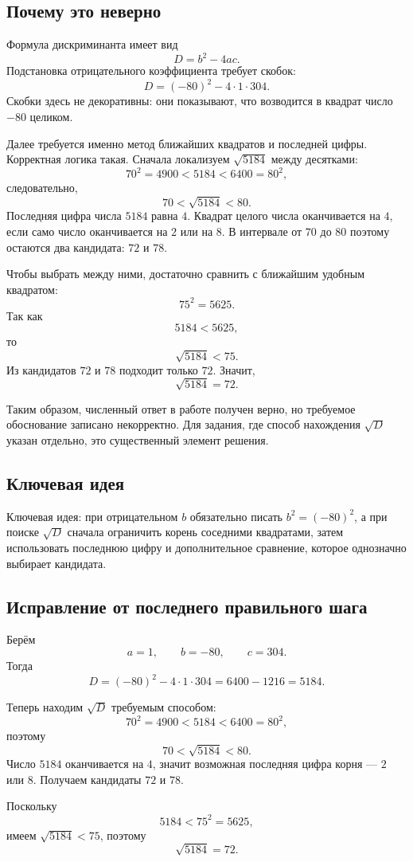 \documentclass[12pt,a4paper]{article}
\begin{document}
\subsection*{Почему это неверно}
Формула дискриминанта имеет вид
\[
D=b^2-4ac.
\]
Подстановка отрицательного коэффициента требует скобок:
\[
D=(-80)^2-4\cdot1\cdot304.
\]
Скобки здесь не декоративны: они показывают, что возводится в квадрат число $-80$ целиком.

Далее требуется именно метод ближайших квадратов и последней цифры. Корректная логика такая. Сначала локализуем $\sqrt{5184}$ между десятками:
\[
70^2=4900<5184<6400=80^2,
\]
следовательно,
\[
70<\sqrt{5184}<80.
\]
Последняя цифра числа $5184$ равна $4$. Квадрат целого числа оканчивается на $4$, если само число оканчивается на $2$ или на $8$. В интервале от $70$ до $80$ поэтому остаются два кандидата: $72$ и $78$.

Чтобы выбрать между ними, достаточно сравнить с ближайшим удобным квадратом:
\[
75^2=5625.
\]
Так как
\[
5184<5625,
\]
то
\[
\sqrt{5184}<75.
\]
Из кандидатов $72$ и $78$ подходит только $72$. Значит,
\[
\sqrt{5184}=72.
\]

Таким образом, численный ответ в работе получен верно, но требуемое обоснование записано некорректно. Для задания, где способ нахождения $\sqrt D$ указан отдельно, это существенный элемент решения.

\subsection*{Ключевая идея}
\textcolor{blue!60!black}{Ключевая идея:} при отрицательном $b$ обязательно писать $b^2=(-80)^2$, а при поиске $\sqrt D$ сначала ограничить корень соседними квадратами, затем использовать последнюю цифру и дополнительное сравнение, которое однозначно выбирает кандидата.

\subsection*{Исправление от последнего правильного шага}
Берём
\[
a=1,\qquad b=-80,\qquad c=304.
\]
Тогда
\[
D=(-80)^2-4\cdot1\cdot304
=6400-1216
=5184.
\]

Теперь находим $\sqrt D$ требуемым способом:
\[
70^2=4900<5184<6400=80^2,
\]
поэтому
\[
70<\sqrt{5184}<80.
\]
Число $5184$ оканчивается на $4$, значит возможная последняя цифра корня --- $2$ или $8$. Получаем кандидаты $72$ и $78$.

Поскольку
\[
5184<75^2=5625,
\]
имеем $\sqrt{5184}<75$, поэтому
\[
\sqrt{5184}=72.
\]
\end{document}
